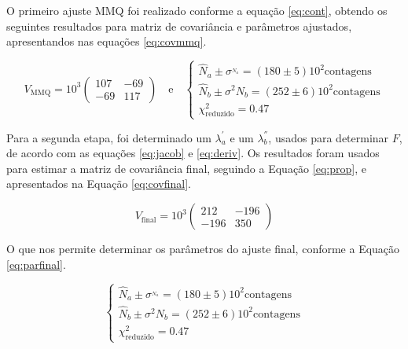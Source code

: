 O primeiro ajuste MMQ foi realizado conforme a equação \eqref{eq:cont}, obtendo os seguintes resultados para matriz de covariância e parâmetros ajustados, apresentandos nas equações \eqref{eq:covmmq}.


\begin{equation}
    V_{\text{MMQ}} = 10^3 \begin{pmatrix}
    107&-69\\
    -69&117
    \end{pmatrix}

    \quad \text{e} \quad

    \begin{cases}
        \hat{N}_{a} \pm \sigma^_{N_{a}} = (180 \pm 5) 10^2 \text{contagens} \\
        \hat{N}_{b} \pm\sigma^2{N_{b}} = (252 \pm 6) 10^2 \text{contagens}\\
        \chi^2_{\text{reduzido}}  = 0.47
    \end{cases}

    \label{eq:covmmq}
\end{equation}

Para a segunda etapa, foi determinado um $\lambda^{'}_{a}$ e um $\lambda^{''}_{b}$, usados para determinar $F$, de acordo com as equações \eqref{eq:jacob} e \eqref{eq:deriv}. Os resultados foram usados para estimar a matriz de covariância final, seguindo a Equação \eqref{eq:prop}, e apresentados na Equação \eqref{eq:covfinal}.

\begin{equation}
    V_{\text{final}} = 10^3\begin{pmatrix}
        212&-196\\
        -196&350
    \end{pmatrix}
    \label{eq:covfinal}
\end{equation}

O que nos permite determinar os parâmetros do ajuste final, conforme a Equação \eqref{eq:parfinal}.

\begin{equation}
    \begin{cases}
        \hat{N}_{a} \pm \sigma^_{N_{a}} = (180 \pm 5) 10^2 \text{contagens} \\
        \hat{N}_{b} \pm\sigma^2{N_{b}} = (252 \pm 6) 10^2 \text{contagens}\\
        \chi^2_{\text{reduzido}}  = 0.47
    \end{cases}
    \label{eq:parfinal}
\end{equation}

